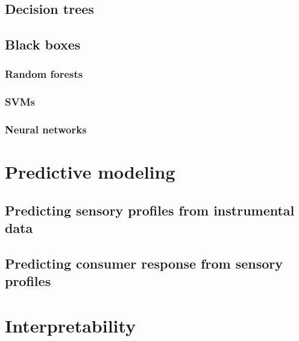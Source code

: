\documentclass[
]{book}
\begin{document}
\hypertarget{decision-trees}{%
\subsection{Decision trees}\label{decision-trees}}

\hypertarget{black-boxes}{%
\subsection{Black boxes}\label{black-boxes}}

\hypertarget{random-forests}{%
\subsubsection{Random forests}\label{random-forests}}

\hypertarget{svms}{%
\subsubsection{SVMs}\label{svms}}

\hypertarget{neural-networks}{%
\subsubsection{Neural networks}\label{neural-networks}}

\hypertarget{predictive-modeling}{%
\section{Predictive modeling}\label{predictive-modeling}}

\hypertarget{predicting-sensory-profiles-from-instrumental-data}{%
\subsection{Predicting sensory profiles from instrumental data}\label{predicting-sensory-profiles-from-instrumental-data}}

\hypertarget{predicting-consumer-response-from-sensory-profiles}{%
\subsection{Predicting consumer response from sensory profiles}\label{predicting-consumer-response-from-sensory-profiles}}

\hypertarget{interpretability}{%
\section{Interpretability}\label{interpretability}}
\end{document}
